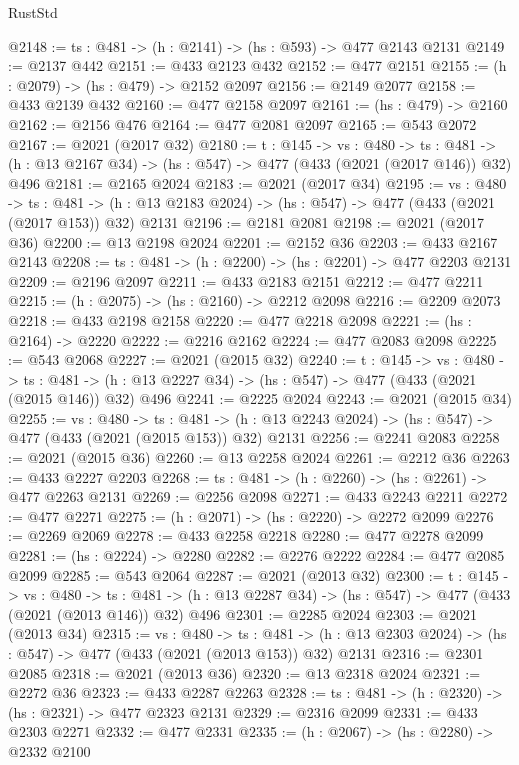 \begin{lexlean}{RustStd}
\begin{coremodule}
@2148 := {ts : @481} -> (h : @2141) -> (hs : @593) -> @477 @2143 @2131
@2149 := @2137 @442
@2151 := @433 @2123 @432
@2152 := @477 @2151
@2155 := (h : @2079) -> (hs : @479) -> @2152 @2097
@2156 := @2149 @2077
@2158 := @433 @2139 @432
@2160 := @477 @2158 @2097
@2161 := (hs : @479) -> @2160
@2162 := @2156 @476
@2164 := @477 @2081 @2097
@2165 := @543 @2072
@2167 := @2021 (@2017 @32)
@2180 := {t : @145} ->
  {vs : @480} ->
  {ts : @481} -> (h : @13 @2167 @34) -> (hs : @547) -> @477 (@433 (@2021 (@2017 @146)) @32) @496
@2181 := @2165 @2024
@2183 := @2021 (@2017 @34)
@2195 := {vs : @480} ->
  {ts : @481} -> (h : @13 @2183 @2024) -> (hs : @547) -> @477 (@433 (@2021 (@2017 @153)) @32) @2131
@2196 := @2181 @2081
@2198 := @2021 (@2017 @36)
@2200 := @13 @2198 @2024
@2201 := @2152 @36
@2203 := @433 @2167 @2143
@2208 := {ts : @481} -> (h : @2200) -> (hs : @2201) -> @477 @2203 @2131
@2209 := @2196 @2097
@2211 := @433 @2183 @2151
@2212 := @477 @2211
@2215 := (h : @2075) -> (hs : @2160) -> @2212 @2098
@2216 := @2209 @2073
@2218 := @433 @2198 @2158
@2220 := @477 @2218 @2098
@2221 := (hs : @2164) -> @2220
@2222 := @2216 @2162
@2224 := @477 @2083 @2098
@2225 := @543 @2068
@2227 := @2021 (@2015 @32)
@2240 := {t : @145} ->
  {vs : @480} ->
  {ts : @481} -> (h : @13 @2227 @34) -> (hs : @547) -> @477 (@433 (@2021 (@2015 @146)) @32) @496
@2241 := @2225 @2024
@2243 := @2021 (@2015 @34)
@2255 := {vs : @480} ->
  {ts : @481} -> (h : @13 @2243 @2024) -> (hs : @547) -> @477 (@433 (@2021 (@2015 @153)) @32) @2131
@2256 := @2241 @2083
@2258 := @2021 (@2015 @36)
@2260 := @13 @2258 @2024
@2261 := @2212 @36
@2263 := @433 @2227 @2203
@2268 := {ts : @481} -> (h : @2260) -> (hs : @2261) -> @477 @2263 @2131
@2269 := @2256 @2098
@2271 := @433 @2243 @2211
@2272 := @477 @2271
@2275 := (h : @2071) -> (hs : @2220) -> @2272 @2099
@2276 := @2269 @2069
@2278 := @433 @2258 @2218
@2280 := @477 @2278 @2099
@2281 := (hs : @2224) -> @2280
@2282 := @2276 @2222
@2284 := @477 @2085 @2099
@2285 := @543 @2064
@2287 := @2021 (@2013 @32)
@2300 := {t : @145} ->
  {vs : @480} ->
  {ts : @481} -> (h : @13 @2287 @34) -> (hs : @547) -> @477 (@433 (@2021 (@2013 @146)) @32) @496
@2301 := @2285 @2024
@2303 := @2021 (@2013 @34)
@2315 := {vs : @480} ->
  {ts : @481} -> (h : @13 @2303 @2024) -> (hs : @547) -> @477 (@433 (@2021 (@2013 @153)) @32) @2131
@2316 := @2301 @2085
@2318 := @2021 (@2013 @36)
@2320 := @13 @2318 @2024
@2321 := @2272 @36
@2323 := @433 @2287 @2263
@2328 := {ts : @481} -> (h : @2320) -> (hs : @2321) -> @477 @2323 @2131
@2329 := @2316 @2099
@2331 := @433 @2303 @2271
@2332 := @477 @2331
@2335 := (h : @2067) -> (hs : @2280) -> @2332 @2100

\end{coremodule}
\end{lexlean}
